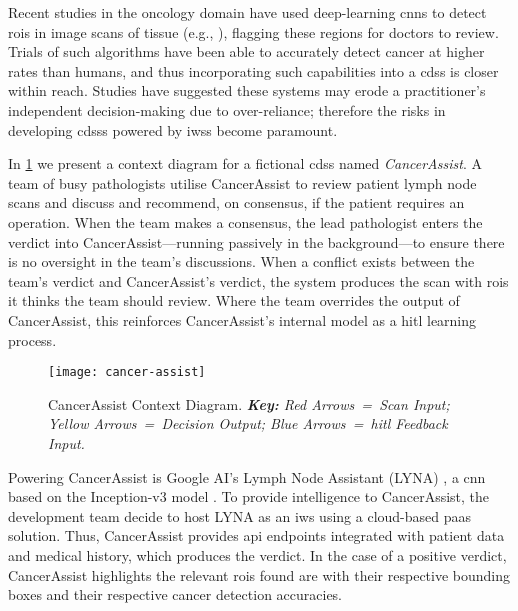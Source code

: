 Recent studies in the oncology domain have used deep-learning \glspl{cnn} to detect \glspl{roi} in image scans of tissue (e.g., \citep{Liu:2018fa,Haenssle:2018bz,EhteshamiBejnordi:2017kq}), flagging these regions for doctors to review. Trials of such algorithms have been able to accurately detect cancer at higher rates than humans, and thus incorporating such capabilities into a \gls{cdss} is closer within reach.  Studies have suggested these systems may erode a practitioner's independent decision-making \citep{Jaspers:2011hy,Chambers:1991uh} due to over-reliance; therefore the risks in developing \glspl{cdss} powered by \glspl{iws} become paramount.

In \cref{fig:introduction:motivation:scenario:cancer} we present a context diagram for a fictional \gls{cdss} named \textit{CancerAssist}. A team of busy pathologists utilise CancerAssist to review patient lymph node scans and discuss and recommend, on consensus, if the patient requires an operation. When the team makes a consensus, the lead pathologist enters the verdict into CancerAssist---running passively in the background---to ensure there is no oversight in the team's discussions. When a conflict exists between the team's verdict and CancerAssist's verdict, the system produces the scan with \glspl{roi} it thinks the team should review. Where the team overrides the output of CancerAssist, this reinforces CancerAssist's internal model as a \gls{hitl} learning process.

\begin{figure}[th]
\centering
  \texttt{[image: cancer-assist]}
  \caption[CancerAssist Context Diagram]{CancerAssist Context Diagram. \textit{\textbf{Key:} Red Arrows~=~Scan Input; Yellow Arrows~=~Decision Output; Blue Arrows~=~\gls{hitl} Feedback Input.}}
  \label{fig:introduction:motivation:scenario:cancer}
\end{figure}

Powering CancerAssist is Google AI's Lymph Node Assistant (LYNA) \citep{Liu:2018fa}, a \gls{cnn} based on the Inception-v3 model \citep{Szegedy:2016ws,Krizhevsky:2012wl}. To provide intelligence to CancerAssist, the development team decide to host LYNA as an \gls{iws} using a cloud-based \gls{paas} solution. Thus, CancerAssist provides \gls{api} endpoints integrated with patient data and medical history, which produces the verdict. In the case of a positive verdict, CancerAssist highlights the relevant \glspl{roi} found are with their respective bounding boxes and their respective cancer detection accuracies.

